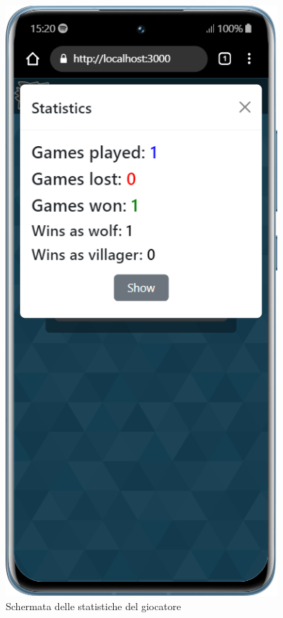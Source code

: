 \begin{figure}[H]
    \centering
    \begin{minipage}{0.45\textwidth}
        \centering
        \includegraphics[width=0.9\textwidth]{img/screen/mobile/stats_mobile.png}
        \caption{Schermata delle statistiche del giocatore}

\end{minipage}
\end{figure}

